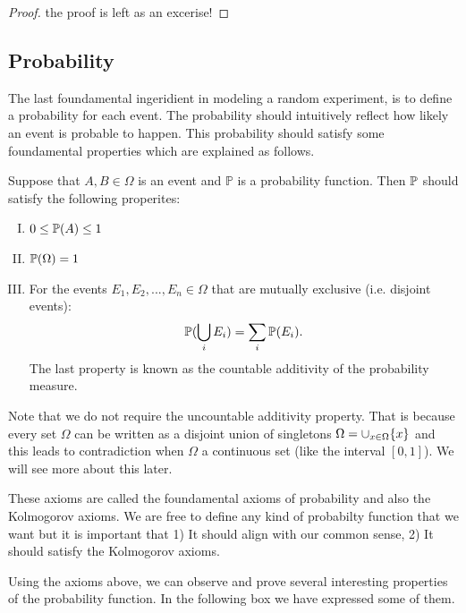 \begin{proof}
	the proof is left as an excerise!
\end{proof}


\subsection{Probability}

The last foundamental ingeridient in modeling a random experiment, is to define a probability for each event. The probability should intuitively reflect how likely an event is probable to happen. This probability should satisfy some foundamental properties which are explained as follows.

\begin{definition}
	
	Suppose that $A, B \in \Omega$ is an event and $\mathbb{P}$ is a probability function. Then $\mathbb{P}$ should satisfy the following properites:
	
	\begin{enumerate}[(I)]
		\item $ 0 \leq \mathbb{P}(A) \leq 1$
		\item $\mathbb{P}(\Omega) = 1$
		\item For the events $E_1, E_2, ..., E_n \in \Omega$ that are mutually exclusive (i.e. disjoint events): $$\mathbb{P}(\bigcup_{i} E_i) = \sum_i \mathbb{P}(E_i).$$
		The last property is known as the countable additivity of the probability measure.
	\end{enumerate}
	
\end{definition}
\begin{remark}
	Note that we do not require the uncountable additivity property. That is because every set $ \Omega $ can be written as a disjoint union of singletons $ \Omega = \cup_{x\in\Omega}\{x\} $ and this leads to contradiction when $ \Omega $ a continuous set (like the interval $ [0,1] $). We will see more about this later.
\end{remark}

These axioms are called the foundamental axioms of probability and also the Kolmogorov axioms. We are free to define any kind of probabilty function that we want but it is important that 1) It should align with our common sense, 2) It should satisfy the Kolmogorov axioms. 

Using the axioms above, we can observe and prove several interesting properties of the probability function. In the following box we have expressed some of them.

